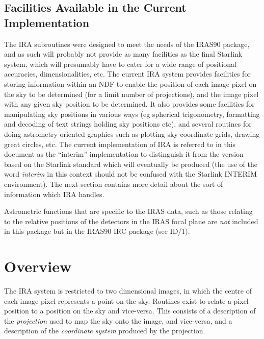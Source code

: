 \subsection {Facilities Available in the Current Implementation}
The IRA subroutines were designed to meet the needs of the IRAS90 package, and
as such will probably not provide as many facilities as the final Starlink
system, which will presumably have to cater for a wide range of positional
accuracies, dimensionalities, etc. The current IRA system provides facilities
for storing information within an NDF to enable the position of each image pixel
on the sky to be determined (for a limit number of projections), and the image
pixel with any given sky position to be determined. It also provides some
facilities for manipulating sky positions in various ways (eg spherical
trigonometry, formatting and decoding of text strings holding sky positions
etc), and several routines for doing astrometry oriented graphics such as
plotting sky coordinate grids, drawing great circles, etc. The current
implementation of IRA is referred to in this document as the ``interim''
implementation to distinguish it from the version based on the Starlink standard
which will eventually be produced (the use of the word {\em interim} in this
context should not be confused with the Starlink INTERIM environment). The next
section contains more detail about the sort of information which IRA handles.

Astrometric functions that are specific to the IRAS data, such as those
relating to the relative positions of the detectors in the IRAS focal plane are
{\em not} included in this package but in the IRAS90 IRC package (see ID/1).

\section {Overview}

The IRA system is restricted to two dimensional images, in which the centre of
each image pixel represents a point on the sky. Routines exist to relate a pixel
position to a position on the sky and vice-versa. This consists of a description
of the {\em projection} used to map the sky onto the image, and vice-versa, and
a description of the {\em coordinate system} produced by the projection.

